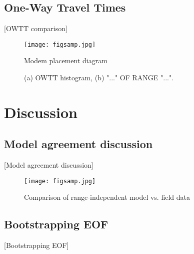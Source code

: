 \subsection{\label{subsec:3:2} One-Way Travel Times}
{\color{red}[OWTT comparison]}

\begin{figure}[ht]
\texttt{[image: figsamp.jpg]}
\caption{\label{fig:FIG3}{Modem placement diagram}}
\end{figure}

\begin{figure}[ht]
\caption{\label{fig:FIG4}{(a) OWTT histogram, (b) "..." OF RANGE "...".}}
\end{figure}



\section{\label{sec:4} Discussion}

\subsection{\label{subsec:4:1} Model agreement discussion}
{\color{red}[Model agreement discussion]}

\begin{figure}[ht]
\texttt{[image: figsamp.jpg]}
\caption{\label{fig:FIG5}{Comparison of range-independent model vs. field data}}
\end{figure}

\subsection{\label{subsec:4:2} Bootstrapping EOF}
{\color{red}[Bootstrapping EOF]}

